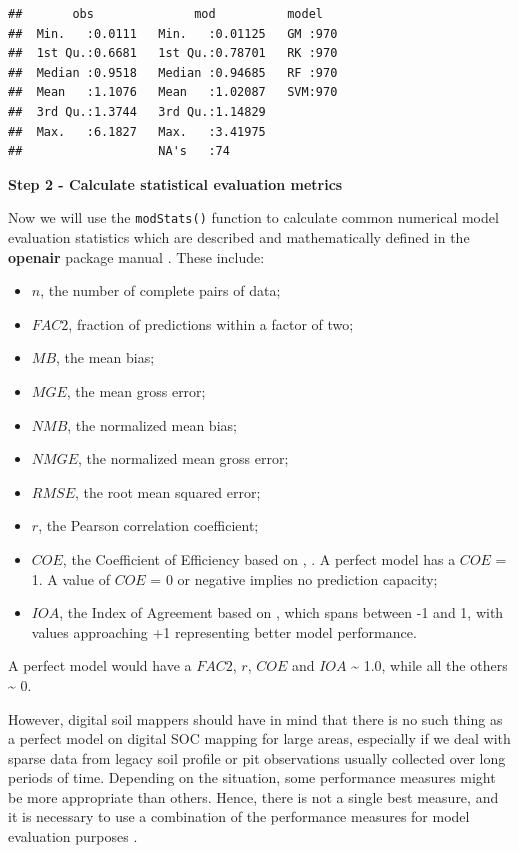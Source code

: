 \documentclass[10pt,b5paper,]{book}
\providecommand{\tightlist}{%
  \setlength{\itemsep}{0pt}\setlength{\parskip}{0pt}}
\theoremstyle{definition}
\theoremstyle{definition}
\theoremstyle{definition}
\theoremstyle{remark}
\begin{document}
\begin{verbatim}
##       obs              mod          model    
##  Min.   :0.0111   Min.   :0.01125   GM :970  
##  1st Qu.:0.6681   1st Qu.:0.78701   RK :970  
##  Median :0.9518   Median :0.94685   RF :970  
##  Mean   :1.1076   Mean   :1.02087   SVM:970  
##  3rd Qu.:1.3744   3rd Qu.:1.14829            
##  Max.   :6.1827   Max.   :3.41975            
##                   NA's   :74
\end{verbatim}

\textbf{Step 2 - Calculate statistical evaluation metrics}

Now we will use the \texttt{modStats()} function to calculate common
numerical model evaluation statistics which are described and
mathematically defined in the \textbf{openair} package manual \citep[Ch.
27, pp.~231-233]{carslaw2015openair}. These include:

\begin{itemize}
\tightlist
\item
  \(n\), the number of complete pairs of data;
\item
  \(FAC2\), fraction of predictions within a factor of two;
\item
  \(MB\), the mean bias;
\item
  \(MGE\), the mean gross error;
\item
  \(NMB\), the normalized mean bias;
\item
  \(NMGE\), the normalized mean gross error;
\item
  \(RMSE\), the root mean squared error;
\item
  \(r\), the Pearson correlation coefficient;
\item
  \(COE\), the Coefficient of Efficiency based on
  \citet{legates1999evaluating}, \citet{legates2013refined}. A perfect
  model has a \(COE\) = 1. A value of \(COE\) = 0 or negative implies no
  prediction capacity;
\item
  \(IOA\), the Index of Agreement based on \citet{willmott2012refined},
  which spans between -1 and 1, with values approaching +1 representing
  better model performance.
\end{itemize}

A perfect model would have a \(FAC2\), \(r\), \(COE\) and \(IOA\)
\textasciitilde{} 1.0, while all the others \textasciitilde{} 0.

However, digital soil mappers should have in mind that there is no such
thing as a perfect model on digital SOC mapping for large areas,
especially if we deal with sparse data from legacy soil profile or pit
observations usually collected over long periods of time. Depending on
the situation, some performance measures might be more appropriate than
others. Hence, there is not a single best measure, and it is necessary
to use a combination of the performance measures for model evaluation
purposes \citep{chang2004air}.
\end{document}
